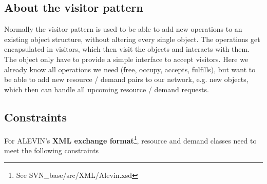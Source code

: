 \subsection{About the visitor pattern}
Normally the visitor pattern is used to be able to add new operations to an existing object structure, 
without altering every single object. 
The operations get encapsulated in visitors, 
which then visit the objects and interacts with them. 
The object only have to provide a simple interface to accept visitors.
Here we already know all operations we need (free, occupy, accepts, fulfills), 
but want to be able to add new resource / demand pairs to our network, e.g. new objects, 
which then can handle all upcoming resource / demand requests.

\subsection{Constraints}
For ALEVIN's \textbf{XML exchange format}\footnote{See SVN\_base/src/XML/Alevin.xsd}, resource and demand classes need to meet the following constraints
